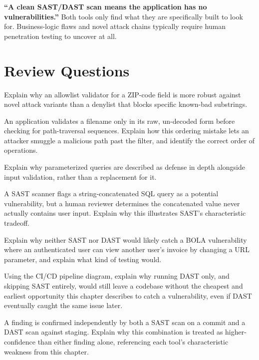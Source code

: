 \begin{misconception}
\textbf{``A clean SAST/DAST scan means the application has no vulnerabilities.''} Both tools only
find what they are specifically built to look for. Business-logic flaws and novel attack chains
typically require human penetration testing to uncover at all.
\end{misconception}

\section*{Review Questions}
\begin{reviewquestions}
\item Explain why an allowlist validator for a ZIP-code field is more robust against novel attack
variants than a denylist that blocks specific known-bad substrings.
\item An application validates a filename only in its raw, un-decoded form before checking for
path-traversal sequences. Explain how this ordering mistake lets an attacker smuggle a malicious
path past the filter, and identify the correct order of operations.
\item Explain why parameterized queries are described as defense in depth alongside input
validation, rather than a replacement for it.
\item A SAST scanner flags a string-concatenated SQL query as a potential vulnerability, but a human
reviewer determines the concatenated value never actually contains user input. Explain why this
illustrates SAST's characteristic tradeoff.
\item Explain why neither SAST nor DAST would likely catch a BOLA vulnerability where an
authenticated user can view another user's invoice by changing a URL parameter, and explain what
kind of testing would.
\item Using the CI/CD pipeline diagram, explain why running DAST only, and skipping SAST entirely,
would still leave a codebase without the cheapest and earliest opportunity this chapter describes
to catch a vulnerability, even if DAST eventually caught the same issue later.
\item A finding is confirmed independently by both a SAST scan on a commit and a DAST scan against
staging. Explain why this combination is treated as higher-confidence than either finding alone,
referencing each tool's characteristic weakness from this chapter.
\end{reviewquestions}


